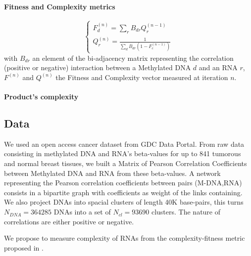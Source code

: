 \documentclass[10pt,a4paper]{article}
\begin{document}
\paragraph{Fitness and Complexity metrics}
\begin{equation}
\left\{
\begin{matrix}
F^{(n)}_{d} =  \sum_{r} B_{dr}Q^{(n-1)}_{r}\\
Q^{(n)}_{r} =  \frac{1}{\sum_{d}B_{dr}(1-F^{(n-1)}_{c})}
\end{matrix}
\right.
\label{eq:eq1}
\end{equation}
with $B_{dr}$ an element of the bi-adjacency matrix representing the correlation (positive or negative) interaction between a Methylated DNA $d$ and an RNA $r$, $F^{(n)}$ and $Q^{(n)}$ the Fitness and Complexity vector measured at iteration $n$.
\paragraph{Product's complexity}
\subsection{Data}
We used an open access cancer dataset from GDC Data Portal. From raw data consisting in methylated DNA and RNA's beta-values for up to 841 tumorous and normal breast tissues, we built a Matrix of Pearson Correlation Coefficients between Methylated DNA and RNA from these beta-values. A network representing the Pearson correlation coefficients between pairs (M-DNA,RNA) consists in a bipartite graph with coefficients as weight of the links containing. We also project DNAs into spacial clusters of length 40K base-pairs, this turns $N_{DNA} = 364285$ DNAs into a set of $N_{cl} = 93690$ clusters. The nature of correlations are either positive or negative.

We propose to measure complexity of RNAs from the complexity-fitness metric proposed in \cite{tacchella12}.
\end{document}
